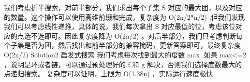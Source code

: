 {}我们考虑折半搜索，对前半部分，我们求出每个子集\markdownRendererDollarSign{} S \markdownRendererDollarSign{}对应的最大团，以及对应的数量。这个操作可以使用高维前缀和完成，复杂度为\markdownRendererDollarSign{} O(2\markdownRendererCircumflex{}\markdownRendererLeftBrace{}n/2\markdownRendererRightBrace{}*\markdownRendererLeftBrace{}n/2\markdownRendererRightBrace{}) \markdownRendererDollarSign{},但我们发现我们可以考虑线性递推，具体的说，我们每次拿出\markdownRendererDollarSign{} S \markdownRendererDollarSign{}对应最低的位，考虑该位对应的点选不选即可。因此复杂度降为\markdownRendererDollarSign{} O(2\markdownRendererCircumflex{}\markdownRendererLeftBrace{}n/2\markdownRendererRightBrace{}) \markdownRendererDollarSign{}。对后半部分，我们只考虑判断每个子集是否为团，然后找出和前半部分的兼容掩码，更新答案即可，最终复杂度\markdownRendererDollarSign{} O(2\markdownRendererCircumflex{}\markdownRendererLeftBrace{}n/2\markdownRendererRightBrace{}) \markdownRendererDollarSign{}\markdownRendererInterblockSeparator
{}\markdownRendererInterblockSeparator
{}\markdownRendererDollarSign{} Solution2 \markdownRendererDollarSign{} 启发式搜索\markdownRendererParagraphSeparator
{}我们考虑每次找到最大的度数\markdownRendererDollarSign{} max\markdownRendererSoftLineBreak
{}\markdownRendererDollarSign{},如果\markdownRendererDollarSign{} max<=2 \markdownRendererDollarSign{}，说明是环或者链，可以通过预处理好的\markdownRendererDollarSign{} f \markdownRendererDollarSign{}和\markdownRendererDollarSign{} g \markdownRendererDollarSign{}解决，否则我们选择度数最大的点递归搜索。\markdownRendererParagraphSeparator
{}复杂度可以证明，上限为\markdownRendererDollarSign{} O(\markdownRendererLeftBrace{}1.38\markdownRendererRightBrace{}\markdownRendererCircumflex{}\markdownRendererLeftBrace{}n\markdownRendererRightBrace{}) \markdownRendererDollarSign{}，实际运行速度极快\markdownRendererInterblockSeparator
{}
\markdownRendererSectionEnd 
\markdownRendererSectionEnd \markdownRendererDocumentEnd
